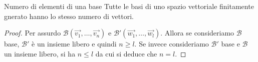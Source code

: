 \begin{SubThm}{Numero di elementi di una base}
  Tutte le basi di uno spazio vettoriale finitamente gnerato hanno lo stesso numero di
  vettori.
\end{SubThm}

\begin{proof}
  Per assurdo $\mathscr{B}(\vec{v_1},\ldots,\vec{v_n})$ e
  $\mathscr{B}'(\vec{w_1},\ldots,\vec{w_l})$. Allora se consideriamo $\mathscr{B}$ base,
  $\mathscr{B}'$ è un insieme libero e quindi $n\geq l$. Se invece consideriamo
  $\mathscr{B}'$ base e $\mathscr{B}$ un insieme libero, si ha $n\leq l$ da cui si
  deduce che $n=l$.
\end{proof}
